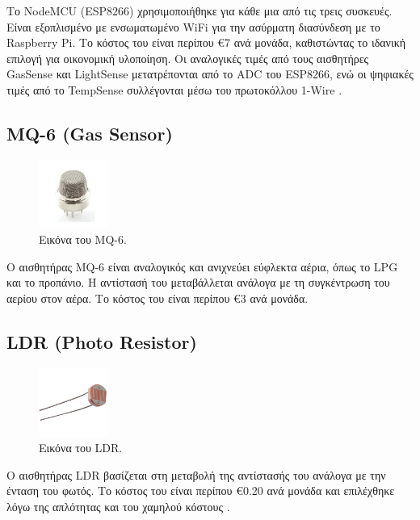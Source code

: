 \documentclass[conference]{IEEEtran}
\begin{document}
Το NodeMCU (ESP8266) χρησιμοποιήθηκε για κάθε μια από τις τρεις συσκευές. Είναι εξοπλισμένο με ενσωματωμένο WiFi για την ασύρματη διασύνδεση με το Raspberry Pi. Το κόστος του είναι περίπου €7 ανά μονάδα, καθιστώντας το ιδανική επιλογή για οικονομική υλοποίηση. \cite{esp8266}  Οι αναλογικές τιμές από τους αισθητήρες GasSense και LightSense μετατρέπονται από το ADC \cite{adc} του ESP8266, ενώ οι ψηφιακές τιμές από το TempSense συλλέγονται μέσω του πρωτοκόλλου 1-Wire \cite{ds18b20-1wire}.

\subsection{MQ-6 (Gas Sensor)}

\begin{figure}[H]
	\centerline{\includegraphics[width=0.2\textwidth]{assets/gas}}
	\caption{Εικόνα του MQ-6.}
	\label{Εικόνα του MQ-6.}
\end{figure}

Ο αισθητήρας MQ-6 είναι αναλογικός και ανιχνεύει εύφλεκτα αέρια, όπως το LPG και το προπάνιο. Η αντίστασή του μεταβάλλεται ανάλογα με τη συγκέντρωση του αερίου στον αέρα. Το κόστος του είναι περίπου €3 ανά μονάδα. \cite{mq6}

\subsection{LDR (Photo Resistor)}

\begin{figure}[H]
	\centerline{\includegraphics[width=0.2\textwidth]{assets/light}}
	\caption{Εικόνα του LDR.}
	\label{Εικόνα του LDR.}
\end{figure}

Ο αισθητήρας LDR βασίζεται στη μεταβολή της αντίστασής του ανάλογα με την ένταση του φωτός. Το κόστος του είναι περίπου €0.20 ανά μονάδα και επιλέχθηκε λόγω της απλότητας και του χαμηλού κόστους . \cite{ldr}
\end{document}
